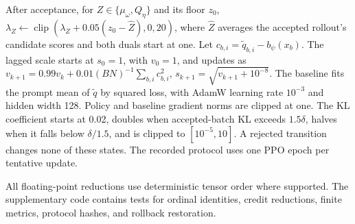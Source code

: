 After acceptance, for \(Z\in\{\mu_\omega,Q_\eta\}\) and its floor \(z_0\),
\(\lambda_Z\leftarrow\operatorname{clip}(\lambda_Z+0.05(z_0-\widehat Z),0,20)\),
where \(\widehat Z\) averages the accepted rollout's candidate scores and
both duals start at one. Let \(c_{b,i}=\widetilde q_{b,i}-b_\psi(x_b)\).
The lagged scale starts at \(s_0=1\), with \(v_0=1\), and updates as
\(v_{k+1}=0.99v_k+0.01(BN)^{-1}\sum_{b,i}c_{b,i}^2\),
\(s_{k+1}=\sqrt{v_{k+1}+10^{-8}}\). The baseline fits the prompt mean of
\(\widetilde q\) by squared loss, with AdamW learning rate \(10^{-3}\) and
hidden width 128. Policy and baseline gradient norms are clipped at one.
The KL coefficient starts at 0.02, doubles when accepted-batch KL exceeds
\(1.5\delta\), halves when it falls below \(\delta/1.5\), and is clipped
to \([10^{-5},10]\). A rejected transition changes none of these states.
The recorded protocol uses one PPO epoch per tentative update.

All floating-point reductions use deterministic tensor order where supported.
The supplementary code contains tests for ordinal identities, credit
reductions, finite metrics, protocol hashes, and rollback restoration.
